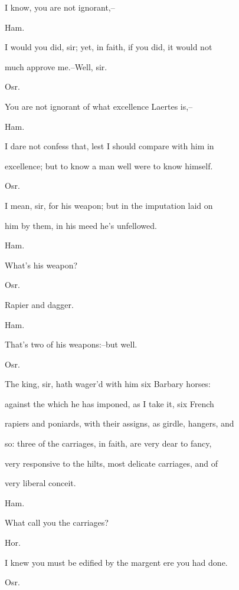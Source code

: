 \documentclass[12pt]{book}
\begin{document}
I know, you are not ignorant,--



Ham.

I would you did, sir; yet, in faith, if you did, it would not

much approve me.--Well, sir.



Osr.

You are not ignorant of what excellence Laertes is,--



Ham.

I dare not confess that, lest I should compare with him in

excellence; but to know a man well were to know himself.



Osr.

I mean, sir, for his weapon; but in the imputation laid on

him by them, in his meed he's unfellowed.



Ham.

What's his weapon?



Osr.

Rapier and dagger.



Ham.

That's two of his weapons:--but well.



Osr.

The king, sir, hath wager'd with him six Barbary horses:

against the which he has imponed, as I take it, six French

rapiers and poniards, with their assigns, as girdle, hangers, and

so: three of the carriages, in faith, are very dear to fancy,

very responsive to the hilts, most delicate carriages, and of

very liberal conceit.



Ham.

What call you the carriages?



Hor.

I knew you must be edified by the margent ere you had done.



Osr.
\end{document}

